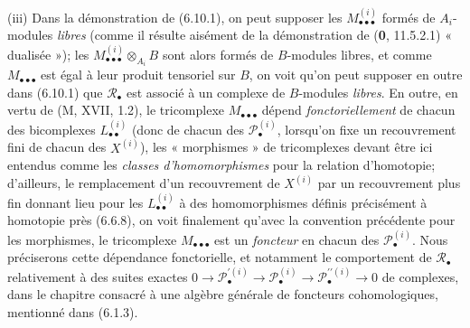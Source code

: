 \begin{remarks}[6.10.3]
\medskip
{}
\textnormal{(iii)} Dans la démonstration de (6.10.1), on peut supposer les
$M_{\bullet\bullet\bullet}^{(i)}$ formés de $A_i$-modules \emph{libres} (comme il
résulte aisément de la démonstration de (\textbf{0}, 11.5.2.1) « dualisée »); les
$M_{\bullet\bullet\bullet}^{(i)}\otimes_{A_i}B$
sont alors formés de $B$-modules libres, et comme
$M_{\bullet\bullet\bullet}$ est égal à leur produit tensoriel sur $B$, on voit
qu'on peut supposer en outre dans (6.10.1) que $\mathscr R_\bullet$ est associé
à un complexe de $B$-modules \emph{libres}. En outre, en vertu de (M, XVII, 1.2), le
tricomplexe $M_{\bullet\bullet\bullet}$ dépend \emph{fonctoriellement} de chacun des
bicomplexes $L_{\bullet\bullet}^{(i)}$ (donc de chacun des
$\mathscr P_\bullet^{(i)}$, lorsqu'on fixe un recouvrement fini de chacun des
$X^{(i)}$), les « morphismes » de tricomplexes devant être ici entendus comme
les \emph{classes d'homomorphismes} pour la relation d'homotopie; d'ailleurs, le
remplacement d'un recouvrement de $X^{(i)}$ par un recouvrement plus fin
donnant lieu pour les $L_{\bullet\bullet}^{(i)}$ à des homomorphismes définis
précisément à homotopie près (6.6.8), on voit finalement qu'avec la convention
précédente pour les morphismes, le tricomplexe
$M_{\bullet\bullet\bullet}$ est un \emph{foncteur} en chacun des
$\mathscr P_\bullet^{(i)}$. Nous préciserons cette dépendance fonctorielle, et
notamment le comportement de $\mathscr R_\bullet$ relativement à des suites
exactes $0\longrightarrow\mathscr P_\bullet^{\prime(i)}\longrightarrow\mathscr P_\bullet^{(i)}\longrightarrow\mathscr P_\bullet^{\prime\prime(i)}\longrightarrow0$
de complexes, dans le chapitre consacré à une algèbre générale de foncteurs
cohomologiques, mentionné dans (6.1.3).
\end{remarks}

